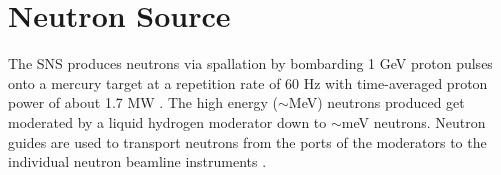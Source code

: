 


\section{Neutron Source}


The SNS produces neutrons via spallation by bombarding 1 GeV proton pulses onto a mercury target at a repetition rate of 60 Hz with time-averaged proton power of about 1.7 MW \cite{Fomin2015}. The high energy ($\sim$MeV) neutrons produced get moderated by a liquid hydrogen moderator down to $\sim$meV neutrons. Neutron guides are used to transport neutrons from the ports of the moderators to the individual neutron beamline instruments \cite{Fomin2015}. 

